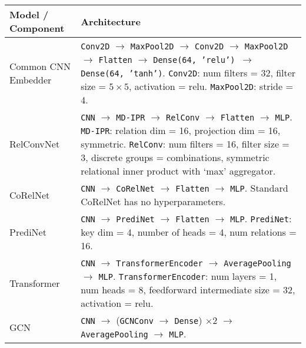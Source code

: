 \begin{tabular}{p{}p{}}
    \toprule
    Model / Component & Architecture                                                                                                                                                                                                                                                                                       \\ \midrule
    Common CNN \newline Embedder & 
        \texttt{Conv2D} $\to$ \texttt{MaxPool2D} $\to$ \texttt{Conv2D} $\to$ \texttt{MaxPool2D} $\to$ \texttt{Flatten} $\to$ \texttt{Dense(64, 'relu') $\to$ \texttt{Dense(64, 'tanh')}}. \newline
        \texttt{Conv2D}: num filters = 32, filter size = $5 \times 5$, activation = relu. \newline
        \texttt{MaxPool2D}: stride = 4. \\\hline
    RelConvNet        & 
        \texttt{CNN} $\to$ \texttt{MD-IPR} $\to$ \texttt{RelConv} $\to$ \texttt{Flatten} $\to$ \texttt{MLP}. \newline
        \texttt{MD-IPR}: relation dim = 16, projection dim = 16, symmetric. \newline
        \texttt{RelConv}: num filters = 16, filter size = 3, discrete groups = combinations, symmetric relational inner product with `max' aggregator. \\\hline
    CoRelNet          &
        \texttt{CNN} $\to$ \texttt{CoRelNet} $\to$ \texttt{Flatten} $\to$ \texttt{MLP}. \newline
        Standard CoRelNet has no hyperparameters. \\\hline
    PrediNet          &
        \texttt{CNN} $\to$ \texttt{PrediNet} $\to$ \texttt{Flatten} $\to$ \texttt{MLP}. \newline
        \texttt{PrediNet}: key dim = 4, number of heads = 4, num relations = 16. \\\hline
    Transformer       & 
        \texttt{CNN} $\to$ \texttt{TransformerEncoder} $\to$ \texttt{AveragePooling} $\to$ \texttt{MLP}. \newline
        \texttt{TransformerEncoder}: num layers = 1, num heads = 8, feedforward intermediate size = 32, activation = relu. \\\hline
    GCN               &
        \texttt{CNN} $\to$ (\texttt{GCNConv} $\to$ \texttt{Dense}) $\times 2$ $\to$ \texttt{AveragePooling} $\to$ \texttt{MLP}. \newline

\end{tabular}
